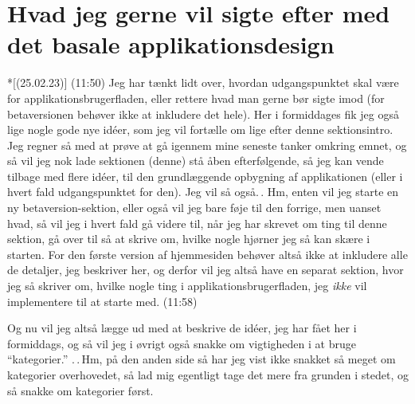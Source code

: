 \documentclass{report}
\begin{document}
\section{Hvad jeg gerne vil sigte efter med det basale applikationsdesign}

*[(25.02.23)] (11:50) Jeg har tænkt lidt over, hvordan udgangspunktet skal være for applikationsbrugerfladen, eller rettere hvad man gerne bør sigte imod (for betaversionen behøver ikke at inkludere det hele). Her i formiddages fik jeg også lige nogle gode nye idéer, som jeg vil fortælle om lige efter denne sektionsintro. Jeg regner så med at prøve at gå igennem mine seneste tanker omkring emnet, og så vil jeg nok lade sektionen (denne) stå åben efterfølgende, så jeg kan vende tilbage med flere idéer, til den grundlæggende opbygning af applikationen (eller i hvert fald udgangspunktet for den). Jeg vil så også.\,. Hm, enten vil jeg starte en ny betaversion-sektion, eller også vil jeg bare føje til den forrige, men uanset hvad, så vil jeg i hvert fald gå videre til, når jeg har skrevet om ting til denne sektion, gå over til så at skrive om, hvilke nogle hjørner jeg så kan skære i starten. For den første version af hjemmesiden behøver altså ikke at inkludere alle de detaljer, jeg beskriver her, og derfor vil jeg altså have en separat sektion, hvor jeg så skriver om, hvilke nogle ting i applikationsbrugerfladen, jeg \emph{ikke} vil implementere til at starte med. (11:58)

Og nu vil jeg altså lægge ud med at beskrive de idéer, jeg har fået her i formiddags, og så vil jeg i øvrigt også snakke om vigtigheden i at bruge ``kategorier.'' .\,.\,Hm, på den anden side så har jeg vist ikke snakket så meget om kategorier overhovedet, så lad mig egentligt tage det mere fra grunden i stedet, og så snakke om kategorier først.
\end{document}
